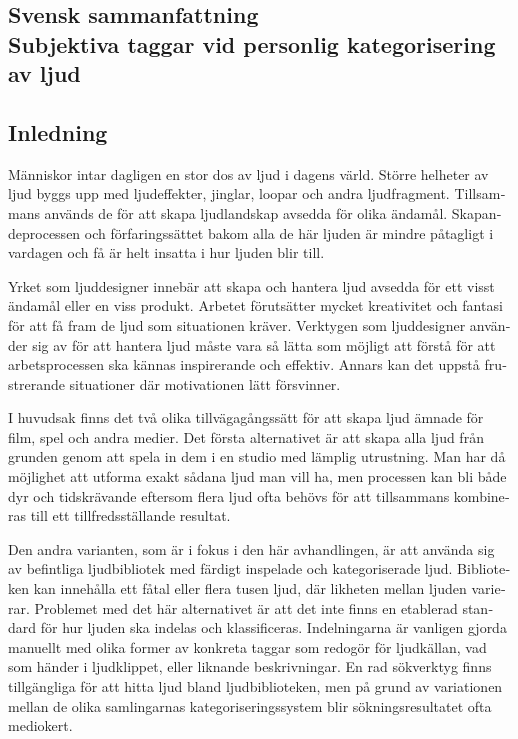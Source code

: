 \begin{otherlanguage}{swedish}

    \newcommand{\name}{Svensk sammanfattning}
    \chapter*{\name{}\\\large{Subjektiva taggar vid personlig kategorisering av ljud}}
    \addcontentsline{toc}{chapter}{\name}

    \section*{Inledning}
    Människor intar dagligen en stor dos av ljud i dagens värld. Större helheter av ljud byggs upp med ljudeffekter, jinglar, loopar och andra ljudfragment. Tillsammans används de för att skapa ljudlandskap avsedda för olika ändamål. Skapandeprocessen och förfaringssättet bakom alla de här ljuden är mindre påtagligt i vardagen och få är helt insatta i hur ljuden blir till.

    Yrket som ljuddesigner innebär att skapa och hantera ljud avsedda för ett visst ändamål eller en viss produkt. Arbetet förutsätter mycket kreativitet och fantasi för att få fram de ljud som situationen kräver. Verktygen som ljuddesigner använder sig av för att hantera ljud måste vara så lätta som möjligt att förstå för att arbetsprocessen ska kännas inspirerande och effektiv. Annars kan det uppstå frustrerande situationer där motivationen lätt försvinner.

    I huvudsak finns det två olika tillvägagångssätt för att skapa ljud ämnade för film, spel och andra medier. Det första alternativet är att skapa alla ljud från grunden genom att spela in dem i en studio med lämplig utrustning. Man har då möjlighet att utforma exakt sådana ljud man vill ha, men processen kan bli både dyr och tidskrävande eftersom flera ljud ofta behövs för att tillsammans kombineras till ett tillfredsställande resultat.

    Den andra varianten, som är i fokus i den här avhandlingen, är att använda sig av befintliga ljudbibliotek med färdigt inspelade och kategoriserade ljud. Biblioteken kan innehålla ett fåtal eller flera tusen ljud, där likheten mellan ljuden varierar. Problemet med det här alternativet är att det inte finns en etablerad standard för hur ljuden ska indelas och klassificeras. Indelningarna är vanligen gjorda manuellt med olika former av konkreta taggar som redogör för ljudkällan, vad som händer i ljudklippet, eller liknande beskrivningar. En rad sökverktyg finns tillgängliga för att hitta ljud bland ljudbiblioteken, men på grund av variationen mellan de olika samlingarnas kategoriseringssystem blir sökningsresultatet ofta mediokert.


\end{otherlanguage}
